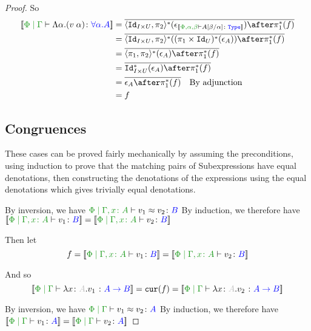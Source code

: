 \documentclass{report}
\begin{document}
\begin{framed}
\begin{proof}
            So
            \begin{align*}
                \deno{\gpetyperelation{\elam{\a}{(\eapp{v}{\a})}}{\all{\a}{A}}} & = \bar{\pr{\Id{I\times U}}{\pp}\star(\e_{\deno{\typerelation{\P,\a,\b}{A\ssub{\a}{\b}}{\type}}})\after\pstar(f)}\\
                & = \bar{\pr{\Id{I\times U}}{\pp}\star((\p\times\Id{U})\star(\e_A))\after\pstar(f)}\\
                & = \bar{\pr{\p}{\pp}\star(\e_A)\after\pstar(f)}\\
                &= \bar{\Id{I\times U}\star(\e_A)\after\pstar(f)}\\
                & = \bar{\e_A\after \pstar(f)}\qt{By adjunction}\\
                & = f
            \end{align*}
        
        \subsection{Congruences}
        These cases can be proved fairly mechanically by assuming the preconditions, using induction to prove that the matching pairs of Subexpressions have equal denotations, then constructing the denotations of the expressions using the equal denotations which gives trivially equal denotations.
        
            By inversion, we have $\eberelation{\P}{\gax}{v_1}{v_2}{B}$
            By induction, we therefore have $\deno{\etyperelation{\P}{\gax}{v_1}{B}} = \deno{\etyperelation{\P}{\gax}{v_2}{B}}$
        
            Then let
            \begin{equation}
                f = \deno{\etyperelation{\P}{\gax}{v_1}{B}} = \deno{\etyperelation{\P}{\gax}{v_2}{B}}
            \end{equation}
        
            And so
            \begin{equation}
                \deno{\gpetyperelation{\lam{x}{A}{v_1}}{\ab}} = \cur{f} = \deno{\gpetyperelation{\lam{x}{A}{v_2}}{\ab}}
            \end{equation}
        
        
        By inversion, we have $\gpeberelation{v_1}{v_2}{A}$
        By induction, we therefore have $\deno{\gpetyperelation{v_1}{A}} = \deno{\gpetyperelation{v_2}{A}}$
        

\end{proof}
\end{framed}
\end{document}

